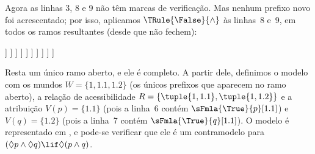 \documentclass[../../../include/open-logic-section]{subfiles}
\begin{document}
{\begin{ex}
  Agora as linhas 3, 8 e 9 não têm marcas de verificação. Mas nenhum
  prefixo novo foi acrescentado; por isso, aplicamos
  $\TRule{\False}{\land}$ às linhas~8 e~9, em todos os ramos resultantes
  (desde que não fechem):
  \begin{oltableau}
    [\pFmla{\False}{(\Diamond p \land \Diamond q) \lif \Diamond(p \land q)}{1},
      just = \TAss, checked
      [\pFmla{\True}{\Diamond p \land \Diamond q}{1},
        just = {\TRule{\False}{\lif}[1]}, checked
        [\pFmla{\False}{\Diamond(p \land q)}{1},
          just = {\TRule{\False}{\lif}[1]}
          [\pFmla{\True}{\Diamond p}{1},
            just = {\TRule{\True}{\land}[2]}, checked
            [\pFmla{\True}{\Diamond q}{1},
              just = {\TRule{\True}{\land}[2]}, checked
              [\pFmla{\True}{p}{1.1}, 
                just = {\TRule{\True}{\Diamond}[4]}, checked
                [\pFmla{\True}{q}{1.2}, 
                  just = {\TRule{\True}{\Diamond}[5]}, checked
                  [\pFmla{\False}{p \land q}{1.1}, 
                    just = {\TRule{\False}{\Diamond}[3]}, checked
                    [\pFmla{\False}{p \land q}{1.2}, 
                      just = {\TRule{\False}{\Diamond}[3]}, checked
                      [\pFmla{\False}{p}{1.1},
                        just = {\TRule{\False}{\land}[8]}, checked, close
                      ]
                      [\pFmla{\False}{q}{1.1},
                        just = {\TRule{\False}{\land}[8]}, checked
                        [\pFmla{\False}{p}{1.2},
                          just = {\TRule{\False}{\land}[9]}, checked]
                        [\pFmla{\False}{q}{1.2},
                          just = {\TRule{\False}{\land}[9]}, checked, close]
                      ]
                    ]
                  ]
                ]
              ]
            ]
          ]
        ]
      ]
    ]
  \end{oltableau}
  Resta um único ramo aberto, e ele é completo. A partir dele, definimos
  o modelo com os mundos $W = \{1, 1.1, 1.2\}$ (os únicos prefixos que
  aparecem no ramo aberto), a relação de acessibilidade
  $R = \{\tuple{1, 1.1}, \tuple{1, 1.2}\}$ e a atribuição $V(p) =
  \{1.1\}$ (pois a linha~6 contém $\sFmla{\True}{p}[1.1]$) e
  $V(q) = \{1.2\}$ (pois a linha~7 contém
  $\sFmla{\True}{q}[1.1]$). O modelo é representado em
  , e pode-se verificar que ele é um
  contramodelo para $(\Diamond p \land \Diamond q) \lif \Diamond (p \land q)$.
  \begin{figure}
  \begin{center}

\end{center}
\end{figure}
\end{ex}}
\end{document}
